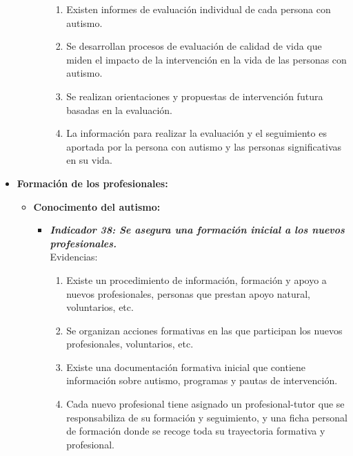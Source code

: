 \begin{itemize}
\begin{itemize}
\begin{itemize}
			\begin{enumerate}
				\item Existen informes de evaluación individual de cada persona con autismo. 
				\item Se desarrollan procesos de evaluación de calidad de vida que miden el impacto de la intervención en la vida de las personas con autismo. 
				\item Se realizan orientaciones y propuestas de intervención futura basadas en la evaluación. 
				\item La información para realizar la evaluación y el seguimiento es aportada por la persona con autismo y las personas significativas en su vida.  
				
			\end{enumerate}
		\end{itemize}
	\end{itemize}
	\item \textbf{Formación de los profesionales:}
	\begin{itemize}
		\item \textbf{Conocimento del autismo:}
		\begin{itemize}
			\item \textbf{\textit{Indicador 38: Se asegura una formación inicial a los nuevos profesionales.}}\\Evidencias:
			
			

			\begin{enumerate}
				\item Existe un procedimiento de información, formación y apoyo a nuevos profesionales, personas que prestan apoyo natural, voluntarios, etc. 
				\item Se organizan acciones formativas en las que participan los nuevos profesionales, voluntarios, etc. 
				\item Existe una documentación formativa inicial que contiene información sobre autismo, programas y pautas de intervención. 
				\item Cada nuevo profesional tiene asignado un profesional-tutor que se responsabiliza de su formación y seguimiento, y una ficha personal de formación donde se recoge toda su trayectoria formativa y profesional. 
				 
			\end{enumerate}


\end{itemize}
\end{itemize}
\end{itemize}
